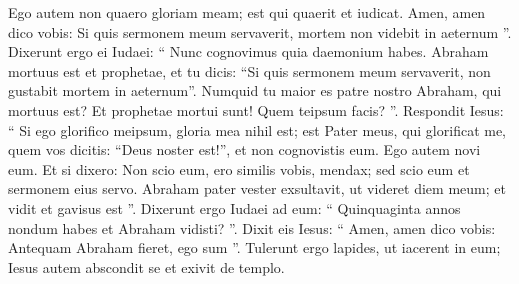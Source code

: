 \begin{biblechapter}
\begin{biblechapter}
\begin{biblechapter}
\begin{biblechapter}
\begin{biblechapter}
\begin{biblechapter}
\begin{biblechapter}
\begin{biblechapter}
\verse Ego autem non quaero gloriam meam; est qui quaerit et iudicat. 
\verse Amen, amen dico vobis: Si quis sermonem meum servaverit, mortem non videbit in aeternum ”. 
 \verse Dixerunt ergo ei Iudaei: “ Nunc cognovimus quia daemonium habes. Abraham mortuus est et prophetae, et tu dicis: “Si quis sermonem meum servaverit, non gustabit mortem in aeternum”. 
\verse Numquid tu maior es patre nostro Abraham, qui mortuus est? Et prophetae mortui sunt! Quem teipsum facis? ”. 
\verse Respondit Iesus: “ Si ego glorifico meipsum, gloria mea nihil est; est Pater meus, qui glorificat me, quem vos dicitis: “Deus noster est!”, 
\verse et non cognovistis eum. Ego autem novi eum. Et si dixero: Non scio eum, ero similis vobis, mendax; sed scio eum et sermonem eius servo. 
\verse Abraham pater vester exsultavit, ut videret diem meum; et vidit et gavisus est ”. 
\verse Dixerunt ergo Iudaei ad eum: “ Quinquaginta annos nondum habes et Abraham vidisti? ”. 
 \verse Dixit eis Iesus: “ Amen, amen dico vobis: Antequam Abraham fieret, ego sum ”. 
 \verse Tulerunt ergo lapides, ut iacerent in eum; Iesus autem abscondit se et exivit de templo.
 

\end{biblechapter}
\end{biblechapter}
\end{biblechapter}
\end{biblechapter}
\end{biblechapter}
\end{biblechapter}
\end{biblechapter}
\end{biblechapter}
